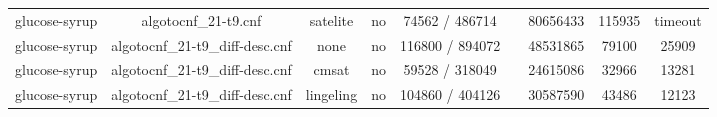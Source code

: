 \begin{appendices}
\begin{table}[p]
\begin{center}
\begin{tabular}{l|cccccccc}
  glucose-syrup                  & algotocnf\_21-t9.cnf           & satelite   & no    & 74562 / 486714 &           & 80656433  & 115935     & timeout \\ %
  glucose-syrup                  & algotocnf\_21-t9\_diff-desc.cnf & none       & no    & 116800 / 894072 &           & 48531865  & 79100      & 25909 \\ %
  glucose-syrup                  & algotocnf\_21-t9\_diff-desc.cnf & cmsat      & no    & 59528 / 318049 &           & 24615086  & 32966      & 13281 \\ %
  glucose-syrup                  & algotocnf\_21-t9\_diff-desc.cnf & lingeling  & no    & 104860 / 404126 &           & 30587590  & 43486      & 12123 \\ %
    \end{tabular}
  \end{center}
\end{table}

\newpage


\end{appendices}
